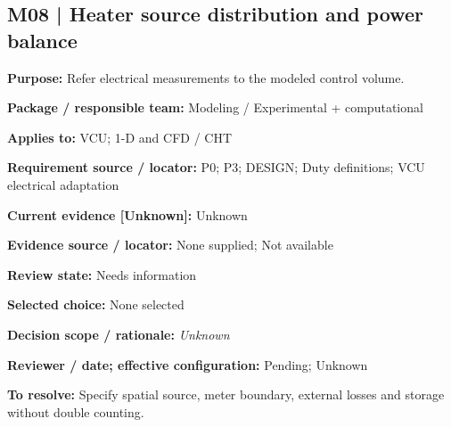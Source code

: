\documentclass[11pt]{article}
\begin{document}
\par\noindent\begin{minipage}{\textwidth}\small\setlength{\parskip}{2pt}
\subsection*{M08 | Heater source distribution and power balance}
\textbf{Purpose:} Refer electrical measurements to the modeled control volume.\par
\textbf{Package / responsible team:} Modeling / Experimental + computational\par
\textbf{Applies to:} VCU; 1-D and CFD / CHT\par
\textbf{Requirement source / locator:} P0; P3; DESIGN; Duty definitions; VCU electrical adaptation\par
\textbf{Current evidence [Unknown]:} Unknown\par
\textbf{Evidence source / locator:} None supplied; Not available\par
\textbf{Review state:} Needs information\par
\textbf{Selected choice:} None selected\par
\textbf{Decision scope / rationale:} \textit{Unknown}\par
\textbf{Reviewer / date; effective configuration:} Pending; Unknown\par
\textbf{To resolve:} Specify spatial source, meter boundary, external losses and storage without double counting.\par
\end{minipage}\par\vspace{5pt}
\end{document}
